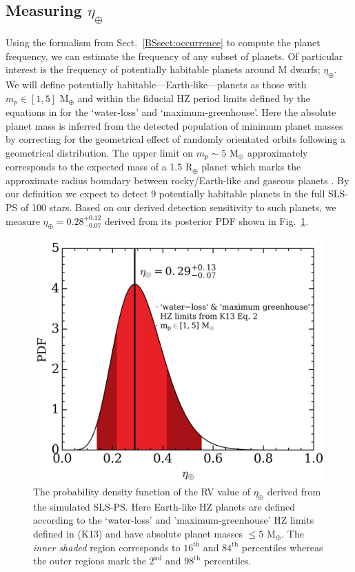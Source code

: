 \subsection{Measuring $\eta_{\oplus}$}
Using the formalism from Sect.~\ref{BSsect:occurrence} to compute the planet frequency,
we can estimate the frequency of any subset of planets. Of particular interest is the frequency 
of potentially habitable planets around M dwarfs; $\eta_{\oplus}$. We will define
potentially habitable---Earth-like---planets as those with $m_p \in [1,5]$
M$_{\oplus}$ and within the fiducial HZ period limits defined by the equations in
\cite{kopparapu13} for the `water-loss' and `maximum-greenhouse'. Here the absolute
planet mass is inferred from the detected population of minimum planet masses by
correcting for the geometrical effect of randomly orientated orbits following a
geometrical distribution.
The upper limit on $m_p \sim 5$ M$_{\oplus}$ approximately corresponds to the expected mass
of a 1.5 R$_{\oplus}$ planet which marks the approximate radius boundary
between rocky/Earth-like and gaseous planets \citep[e.g.][]{valencia13, lopez14, fulton17}.  
By our definition we expect to detect 9 potentially habitable planets
in the full SLS-PS of 100 stars. Based on our derived detection sensitivity to such planets,
we measure $\eta_{\oplus}=0.28^{+0.12}_{-0.07}$ derived from its posterior PDF shown in
Fig.~\ref{BSfig:etaEarth}.

\begin{figure}
  \centering
  \includegraphics[width=0.6\hsize]{figures/etaEarth.png}
  \caption[Expected measurement of $\eta_{\oplus}$ from the SLS-PS.]
      {\small The probability density function of the RV value of $\eta_{\oplus}$ derived from
    the simulated SLS-PS. Here Earth-like HZ planets are defined according to the `water-loss'
    and 'maximum-greenhouse' HZ limits defined in \citealt{kopparapu13} (K13) and have absolute planet
    masses $\leq 5$ M$_{\oplus}$. The \emph{inner shaded} region corresponds to $16^{\text{th}}$ and
    $84^{\text{th}}$ percentiles whereas the outer regions mark the $2^{\text{nd}}$ and
    $98^{\text{th}}$ percentiles.}
  \label{BSfig:etaEarth}
\end{figure}

